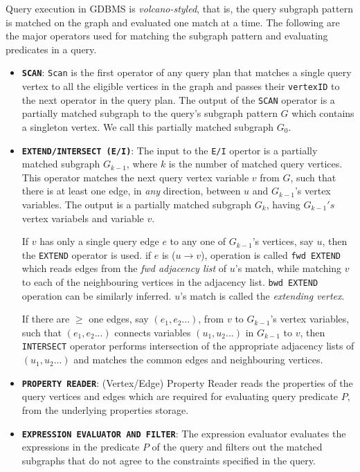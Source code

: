Query execution in GDBMS is \emph{volcano-styled}, that is, the query subgraph pattern is matched on the graph and evaluated one match at a time. The following are the major operators used for matching the subgraph pattern and evaluating predicates in a query.
\begin{itemize}
	
	\item \textbf{\texttt{SCAN}}: \texttt{Scan} is the first operator of any query plan that matches a single query vertex to all the eligible vertices in the graph and passes their \texttt{vertexID} to the next operator in the query plan. The output of the \texttt{SCAN} operator is a partially matched subgraph to the query's subgraph pattern $G$ which contains a singleton vertex. We call this partially matched subgraph $G_0$.
	
	\item \textbf{\texttt{EXTEND/INTERSECT (E/I)}}: The input to the \texttt{E/I} opertor is a partially matched subgraph $G_{k-1}$, where $k$ is the number of matched query vertices. This operator matches the next query vertex variable $v$ from $G$, such that there is at least one edge, in \emph{any} direction, between $u$ and $G_{k-1}$'s vertex variables. The output is a partially matched subgraph $G_{k}$, having $G_{k-1}'s$ vertex variabels and variable $v$. 
	
	If $v$ has only a single query edge $e$ to any one of $G_{k-1}$'s vertices, say $u$, then the \texttt{EXTEND} operator is used. if $e$ is ($u\rightarrow v$), operation is called \texttt{\gls{fwd} EXTEND} which reads edges from the \emph{\gls{fwd} adjacency list} of $u$'s match, while matching $v$ to each of the neighbouring vertices in the adjacency list. \texttt{\gls{bwd} EXTEND} operation can be similarly inferred. $u$'s match is called the \emph{extending vertex}.
	
	If there are $\ge$ one edges, say $(e_1, e_2 ...)$, from $v$ to $G_{k-1}$'s vertex variables, such that $(e_1, e_2 ...)$ connects variables $(u_1, u_2 ...)$ in $G_{k-1}$ to $v$, then \texttt{INTERSECT} operator performs intersection of the appropriate adjacency lists of $(u_1, u_2 ...)$ and matches the common edges and neighbouring vertices.  
	
	\item \textbf{\texttt{PROPERTY READER}}: (Vertex/Edge) Property Reader reads the properties of the query vertices and edges which are required for evaluating query predicate $P$, from the underlying properties storage. 
	
	\item \textbf{\texttt{EXPRESSION EVALUATOR AND FILTER}}: The expression evaluator evaluates the expressions in the predicate $P$ of the query and filters out the matched subgraphs that do not agree to the constraints specified in the query.
	
\end{itemize}

